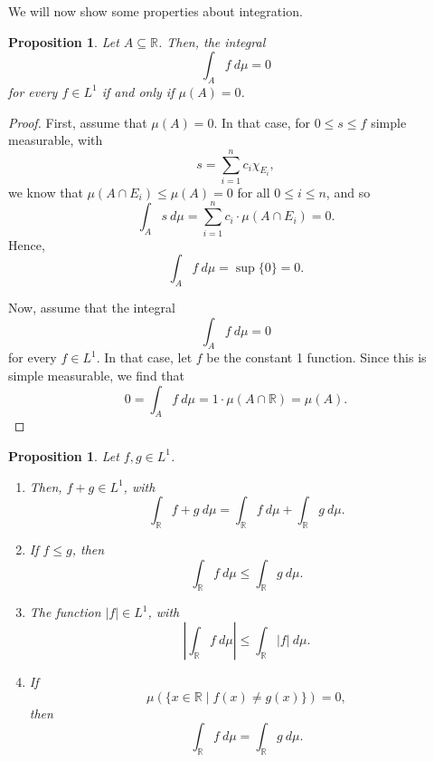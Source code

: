 \documentclass[a4paper, openany]{memoir}
\theoremstyle{definition}
\theoremstyle{plain}
\newtheorem{proposition}[definition]{Proposition}
\begin{document}
    We will now show some properties about integration.
    \begin{proposition}
        Let $A \subseteq \mathbb{R}$. Then, the integral
        \[\int_{A} f \ d\mu = 0\]
        for every $f \in L^1$ if and only if $\mu(A) = 0$.
    \end{proposition}
    \begin{proof}
        First, assume that $\mu(A) = 0$. In that case, for $0 \leq s \leq f$ simple measurable, with
        \[s = \sum_{i=1}^{n} c_i \chi_{E_i},\]
        we know that $\mu(A \cap E_i) \leq \mu(A) = 0$ for all $0 \leq i \leq n$, and so
        \[\int_A s \ d\mu = \sum_{i=1}^{n} c_i \cdot \mu(A \cap E_i) = 0.\]
        Hence,
        \[\int_A f \ d\mu = \sup \{0\} = 0.\]

        Now, assume that the integral
        \[\int_A f \ d\mu = 0\]
        for every $f \in L^1$. In that case, let $f$ be the constant 1 function. Since this is simple measurable, we find that
        \[0 = \int_A f \ d\mu = 1 \cdot \mu(A \cap \mathbb{R}) = \mu(A).\]
    \end{proof}
    \begin{proposition}
        Let $f, g \in L^1$.
        \begin{enumerate}
            \item Then, $f + g \in L^1$, with
            \[\int_{\mathbb{R}} f + g \ d\mu = \int_{\mathbb{R}} f \ d\mu + \int_{\mathbb{R}} g \ d\mu.\]
            
            \item If $f \leq g$, then 
            \[\int_{\mathbb{R}} f \ d\mu \leq \int_{\mathbb{R}} g \ d\mu.\]
            
            \item The function $|f| \in L^1$, with 
            \[\left|\int_{\mathbb{R}} f \ d\mu\right| \leq \int_{\mathbb{R}} |f| \ d\mu.\]
            
            \item If 
            \[\mu(\{x \in \mathbb{R} \mid f(x) \neq g(x)\}) = 0,\]
            then 
            \[\int_{\mathbb{R}} f \ d\mu = \int_{\mathbb{R}} g \ d\mu.\]
        \end{enumerate}
    \end{proposition}
\end{document}
